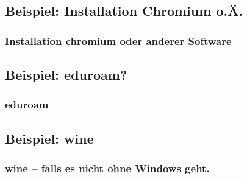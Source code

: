 \documentclass{beamer}
\begin{document}
        \subsection{Beispiel: Installation Chromium o.Ä.}
            \begin{frame}
          		\frametitle{Installation chromium oder anderer Software}
        		\begin{minipage}{0.44\textwidth}
        		
        		\end{minipage}%
        		\begin{minipage}{0.54\textwidth}
        		
        		\end{minipage}
        	\end{frame}
        
        \subsection{Beispiel: eduroam?}
            \begin{frame}
          		\frametitle{eduroam}
        		\begin{minipage}{0.44\textwidth}
        		
        		\end{minipage}%
        		\begin{minipage}{0.54\textwidth}
        		
        		\end{minipage}
        	\end{frame}
        	
        \subsection{Beispiel: wine}
            \begin{frame}
          		\frametitle{wine -- falls es nicht ohne Windows geht.}
        		\begin{minipage}{0.44\textwidth}
        		
        		\end{minipage}%
        		\begin{minipage}{0.54\textwidth}
        		
        		\end{minipage}
        	\end{frame}
        	
\end{document}
